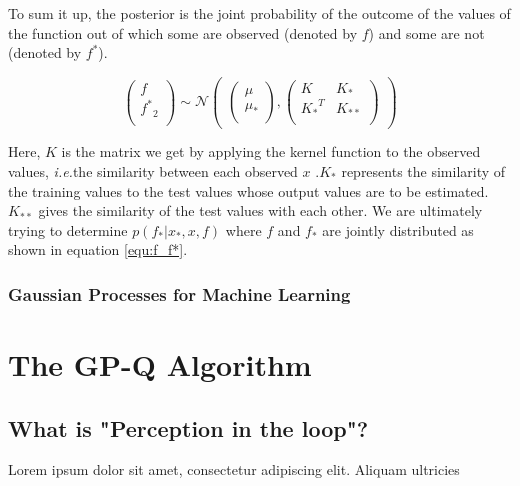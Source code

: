 \documentclass[12pt]{report}
\newcommand{\ie}{\textit{i.e.}}
\begin{document}
To sum it up, the posterior is the joint probability of the outcome of the values of the function out of which some are observed (denoted by $f$) and some are not (denoted by $f^*$). 

\begin{equation}
\label{equ:f_f*}
\begin{pmatrix}f\\
{f^*}_2\\
\end{pmatrix} 
\sim \mathcal{N}\begin{pmatrix} 
\begin{pmatrix}\mu\\
\mu_*\\
\end{pmatrix} ,\begin{pmatrix}K & K_*\\
{K_*}^T & K_{**}\\
\end{pmatrix} 
\end{pmatrix}
\end{equation}

Here, $K$ is the matrix we get by applying the kernel function to the observed values, \ie the similarity between each observed $x$ .$K_*$ represents the similarity of the training values to the test values whose output values are to be estimated. $K_{**}$ gives the similarity of the test values with each other. We are ultimately trying to determine $p(f_*|x_*,x,f)$ where $f$ and $f_*$ are jointly distributed as shown in equation \ref{equ:f_f*}.

\subsection{Gaussian Processes for Machine Learning}


\chapter{The GP-Q Algorithm} %

\label{gpq} %
\section{What is "Perception in the loop"?}

Lorem ipsum dolor sit amet, consectetur adipiscing elit. Aliquam ultricies 
\end{document}
